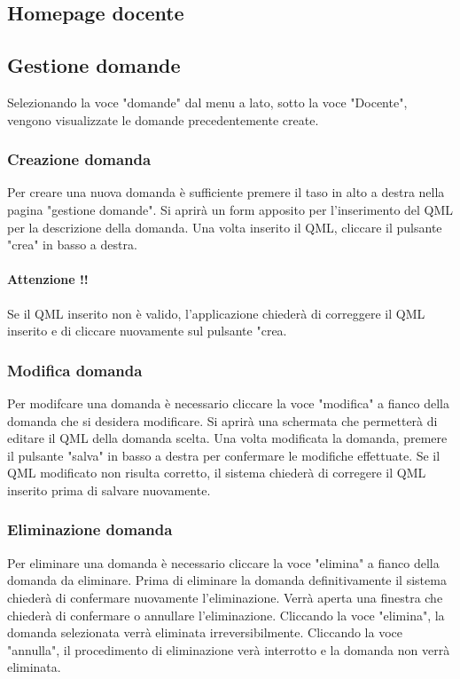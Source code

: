 \documentclass[12pt,a4paper]{article}
\begin{document}
	\subsection{Homepage docente}
	
    \subsection{Gestione domande}

    Selezionando la voce "domande" dal menu a lato, sotto la voce "Docente", vengono visualizzate le domande precedentemente create. 
	\subsubsection{Creazione domanda}
	Per creare una nuova domanda è sufficiente premere il taso in alto a destra nella pagina "gestione domande". 
	Si aprirà un form apposito per l'inserimento del QML per la descrizione della domanda.
	Una volta inserito il QML, cliccare il pulsante "crea" in basso a destra.
	
	\paragraph{Attenzione !!}Se il QML inserito non è valido, l'applicazione chiederà di correggere il QML inserito e di cliccare nuovamente sul pulsante "crea.
		\subsubsection{Modifica domanda}
	Per modifcare una domanda è necessario cliccare la voce "modifica" a fianco della domanda che si desidera modificare. Si aprirà una schermata che permetterà di editare il QML della domanda scelta.
	Una volta modificata la domanda, premere il pulsante "salva" in basso a destra per confermare le modifiche effettuate. 
	Se il QML modificato non risulta corretto, il sistema chiederà di corregere il QML inserito prima di salvare nuovamente.
	
		\subsubsection{Eliminazione domanda}
		Per eliminare una domanda è necessario cliccare la voce "elimina" a fianco della domanda da eliminare. Prima di eliminare la domanda definitivamente il sistema chiederà di confermare nuovamente l'eliminazione.
		Verrà aperta una finestra che chiederà di confermare o annullare l'eliminazione. Cliccando la voce "elimina", la domanda selezionata verrà eliminata irreversibilmente. Cliccando la voce "annulla", il procedimento di eliminazione verà interrotto e la domanda non verrà eliminata.
		
\end{document}
